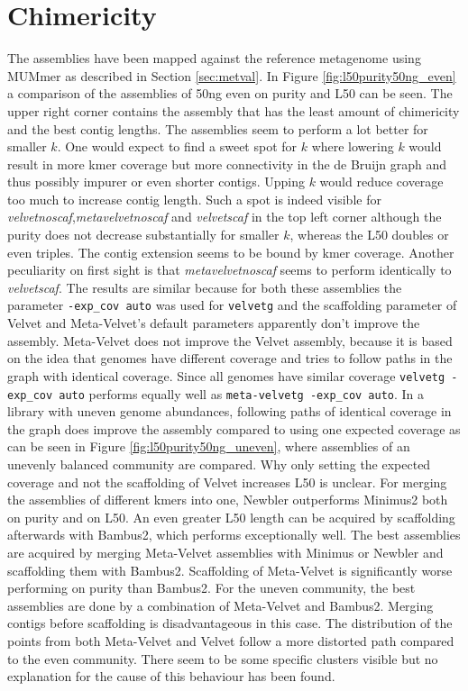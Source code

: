 \documentclass[a4paper,12pt]{report}
\begin{document}
\section{Chimericity}
The assemblies have been mapped against the reference metagenome using MUMmer
as described in Section \ref{sec:metval}. In Figure
\ref{fig:l50purity50ng_even} a comparison of the assemblies of 50ng even on
purity and L50 can be seen. The upper right corner contains the assembly that
has the least amount of chimericity and the best contig lengths. The assemblies
seem to perform a lot better for smaller $k$. One would expect to find a sweet
spot for $k$ where lowering $k$ would result in more kmer coverage but more
connectivity in the de Bruijn graph and thus possibly impurer or even shorter
contigs. Upping $k$ would reduce coverage too much to increase contig length.
Such a spot is indeed visible for {\em velvetnoscaf},{\em metavelvetnoscaf} and
{\em velvetscaf} in the top left corner although the purity does not decrease
substantially for smaller $k$, whereas the L50 doubles or even triples. The
contig extension seems to be bound by kmer coverage. Another peculiarity on
first sight is that {\em metavelvetnoscaf} seems to perform identically to {\em
velvetscaf}. The results are similar because for both these assemblies the
parameter \verb!-exp_cov auto! was used for \verb!velvetg! and the scaffolding
parameter of Velvet and Meta-Velvet's default parameters apparently don't
improve the assembly. Meta-Velvet does not improve the Velvet assembly, because
it is based on the idea that genomes have different coverage and tries to
follow paths in the graph with identical coverage. Since all genomes have
similar coverage \verb!velvetg -exp_cov auto!  performs equally well as
\verb!meta-velvetg -exp_cov auto!. In a library with uneven genome abundances,
following paths of identical coverage in the graph does improve the assembly
compared to using one expected coverage as can be seen in Figure
\ref{fig:l50purity50ng_uneven}, where assemblies of an unevenly balanced
community are compared. Why only setting the expected coverage and not the
scaffolding of Velvet increases L50 is unclear. For merging the assemblies of
different kmers into one, Newbler outperforms Minimus2 both on purity and on
L50. An even greater L50 length can be acquired by scaffolding afterwards with
Bambus2, which performs exceptionally well. The best assemblies are
acquired by merging Meta-Velvet assemblies with Minimus or Newbler and
scaffolding them with Bambus2. Scaffolding of Meta-Velvet is significantly
worse performing on purity than Bambus2. For the uneven community, the best
assemblies are done by a combination of Meta-Velvet and Bambus2. Merging
contigs before scaffolding is disadvantageous in this case. The distribution of
the points from both Meta-Velvet and Velvet follow a more distorted path
compared to the even community. There seem to be some specific clusters visible
but no explanation for the cause of this behaviour has been found.
\end{document}
